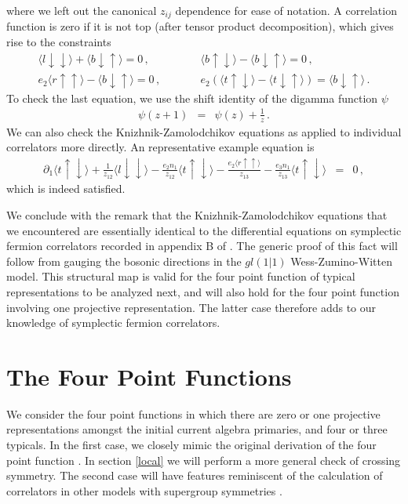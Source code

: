 \documentclass[12pt]{article}
\numberwithin{equation}{section}
\numberwithin{equation}{section}
\numberwithin{table}{section}\setlength{\multlinegap}{25pt}
\begin{document}
where we left out the canonical $z_{ij}$ dependence for ease of notation.
A correlation function is zero if it is not top (after tensor product decomposition),
which gives rise to the constraints
\begin{eqnarray}
\langle l \downarrow \downarrow \rangle + \langle b \downarrow \uparrow \rangle  = 0 \, , \qquad
& & 
\langle b \uparrow \downarrow \rangle - \langle b \downarrow \uparrow  \rangle = 0 \, ,
\nonumber
 \\
e_2 \langle r \uparrow \uparrow \rangle  - \langle b \downarrow \uparrow  \rangle = 0\, , \qquad
& & 
e_2 (\langle t \uparrow \downarrow \rangle  - \langle t \downarrow \uparrow \rangle ) = \langle b \downarrow \uparrow  \rangle \, .
\end{eqnarray}
To check the last equation, we use the shift identity of the digamma function $\psi$
\begin{eqnarray}
\psi(z+1) &=& \psi(z) + \frac{1}{z} \, .
\end{eqnarray}
We can also check the Knizhnik-Zamolodchikov equations as applied to individual correlators more directly.
An representative example equation is 
\begin{eqnarray}
\partial_1 \langle t \uparrow \downarrow \rangle + \frac{1}{z_{12}} \langle l \downarrow \downarrow \rangle
- \frac{e_2 n_1}{z_{12}} \langle t \uparrow \downarrow \rangle
- \frac{e_2 \langle r \uparrow \uparrow \rangle}{z_{13}} - \frac{e_3 n_1}{z_{13}} \langle t \uparrow \downarrow \rangle &=& 0 \, , \nonumber
\end{eqnarray}
which is indeed satisfied.

 We conclude with the remark that the Knizhnik-Zamolodchikov equations that we encountered
are essentially identical to the differential equations on symplectic fermion correlators recorded in appendix B of \cite{Kausch:2000fu}.
The generic proof of this fact will follow from gauging the bosonic directions in the $gl(1|1)$ Wess-Zumino-Witten model. This structural
map is valid for the four point function of typical representations to be analyzed next, and will also hold for the four point function involving
one projective representation. The latter case therefore adds to our knowledge of symplectic fermion correlators.


\section{The Four Point Functions}
\label{four}
We consider the four point functions in which there are zero or one projective representations amongst
the initial current algebra primaries, and four or three typicals. In the first case, we closely mimic the
original derivation of the four point function \cite{Rozansky:1992rx}. In section \ref{local} we will perform a more general
check of crossing symmetry.  The second case will have features reminiscent of the calculation of correlators
in other models with supergroup symmetries \cite{Maassarani:1996jn}.
\end{document}
